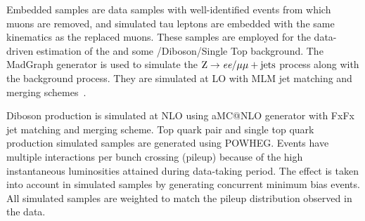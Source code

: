 Embedded samples are data samples with well-identified \Zmm events from which muons are removed, and simulated tau leptons are embedded with the same kinematics as the replaced muons. These samples are employed for the data-driven estimation of the \Ztt and some \ttbar/Diboson/Single Top background. The MadGraph generator is used to simulate the $\text{Z} \to \textit{e} \textit{e}/\mu{}\mu + \text{jets}$ process along with the \wjets background process. They are simulated at LO with MLM jet matching and merging schemes~\cite{Alwall:2007fs}.

Diboson production is simulated at NLO using aMC@NLO generator with FxFx jet matching and merging scheme. Top quark pair and single top quark production simulated samples are generated using POWHEG. Events have multiple \pp interactions per bunch crossing (pileup) because of the high instantaneous luminosities attained during data-taking period. The effect is taken into account in simulated samples by generating concurrent minimum bias events. All simulated samples are weighted to match the pileup distribution observed in the data.
